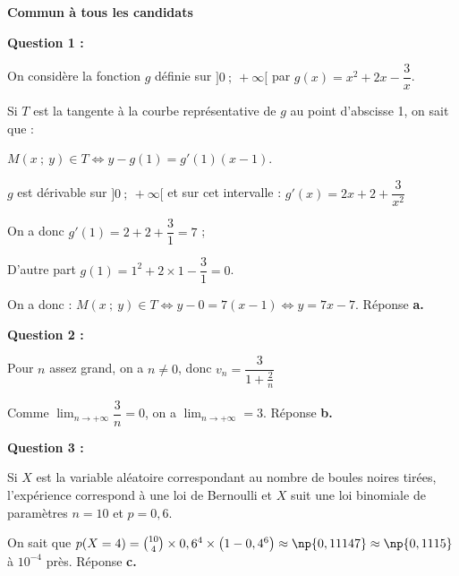 \textbf{Commun à tous les candidats}

\medskip














\textbf{Question 1 :}

On considère la fonction $g$ définie sur $]0~;~+\infty[$  par $g(x)= x^2+ 2x - \dfrac{3}{x}$.







Si $T$ est la tangente à la courbe représentative de $g$ au point d'abscisse 1, on sait que :

$M(x~;~y) \in T \iff y - g(1) = g'(1)(x - 1)$.

\starredbullet $g$ est dérivable sur $]0~;~+\infty[$ et sur cet intervalle : $g'(x) = 2x + 2 + \dfrac{3}{x^2}$

On a donc $g'(1) = 2 + 2 + \dfrac{3}{1} = 7$ ;

\starredbullet D'autre part $g(1) = 1^2 + 2 \times 1 - \dfrac{3}{1} = 0$.

On a donc : $M(x~;~y) \in T \iff y - 0 = 7(x - 1) \iff y = 7x - 7$. Réponse \textbf{a.}

\medskip

\textbf{Question 2 :}









Pour $n$ assez grand, on a $n \ne 0$, donc $v_n = \dfrac{3}{1 + \frac{2}{n}}$

Comme $\displaystyle\lim_{n \to + \infty} \dfrac{3}{n} = 0$, on a $\displaystyle\lim_{n \to + \infty} = 3$. Réponse \textbf{b.}

\medskip

\textbf{Question 3 :}








Si $X$ est la variable aléatoire correspondant au nombre de boules noires tirées, l'expérience correspond à une loi de Bernoulli  et $X$ suit une loi binomiale de paramètres $n = 10$ et $p = 0,6$.

On sait que $p(X = 4) = \binom{10}{4} \times 0,6^4 \times \left(1 - 0,4^6\right) \approx \np{0,11147} \approx \np{0,1115}$ à $10^{-4}$ près. Réponse \textbf{c.~~}
\medskip

